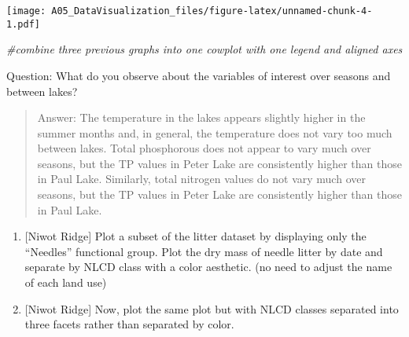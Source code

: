 \documentclass[
]{article}
\newenvironment{Shaded}{\begin{snugshade}}{\end{snugshade}}
\newcommand{\CommentTok}[1]{\textcolor[rgb]{0.56,0.35,0.01}{\textit{#1}}}
\begin{document}
\texttt{[image: A05\_DataVisualization\_files/figure-latex/unnamed-chunk-4-1.pdf]}

\begin{Shaded}
\begin{Highlighting}[]
\CommentTok{#combine three previous graphs into one cowplot with one legend and aligned axes}
\end{Highlighting}
\end{Shaded}

Question: What do you observe about the variables of interest over
seasons and between lakes?

\begin{quote}
Answer: The temperature in the lakes appears slightly higher in the
summer months and, in general, the temperature does not vary too much
between lakes. Total phosphorous does not appear to vary much over
seasons, but the TP values in Peter Lake are consistently higher than
those in Paul Lake. Similarly, total nitrogen values do not vary much
over seasons, but the TP values in Peter Lake are consistently higher
than those in Paul Lake.
\end{quote}

\begin{enumerate}
\def\labelenumi{\arabic{enumi}.}
\setcounter{enumi}{5}
\item
  {[}Niwot Ridge{]} Plot a subset of the litter dataset by displaying
  only the ``Needles'' functional group. Plot the dry mass of needle
  litter by date and separate by NLCD class with a color aesthetic. (no
  need to adjust the name of each land use)
\item
  {[}Niwot Ridge{]} Now, plot the same plot but with NLCD classes
  separated into three facets rather than separated by color.
\end{enumerate}
\end{document}
